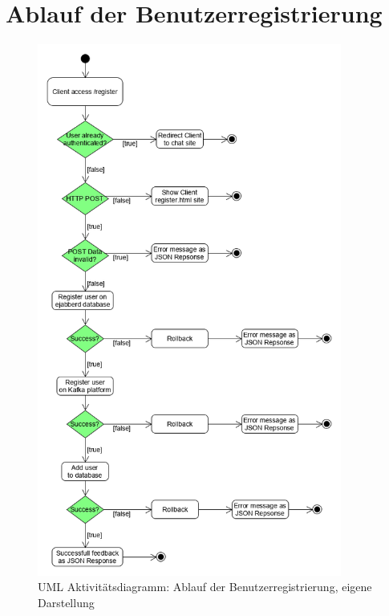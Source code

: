 \documentclass[a4paper,titlepage,halfparskip,12pt]{scrreprt}
\begin{document}
\section{Ablauf der Benutzerregistrierung}

\begin{figure}[h]
	\centering
	\includegraphics[height=17.5cm]{images/umlRegistration}
	\caption{\acs{UML} Aktivitätsdiagramm: Ablauf der Benutzerregistrierung, eigene Darstellung}
	\label{img:umlActivityRegistration}
\end{figure}
\end{document}
